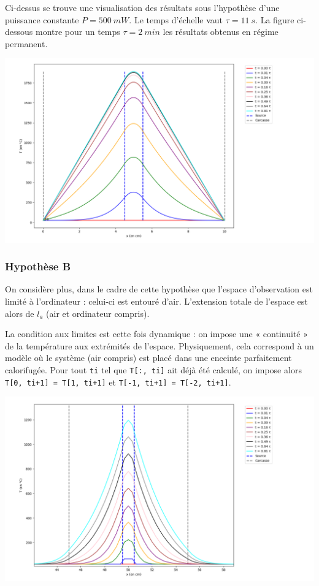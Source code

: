 \documentclass{article}
\newcommand{\p}{\texttt} %
\begin{document}
Ci-dessus se trouve une visualisation des résultats sous l'hypothèse d'une puissance constante $P = \SI{500}{mW}$. Le temps d'échelle vaut $\tau = \SI{11}{s}$. La figure ci-dessous montre pour un temps $\tau = \SI{2}{min}$ les résultats obtenus en régime permanent.

\includegraphics[scale=0.37]{1dA_P500mW_t110s.png}

\subsubsection{Hypothèse B}

On considère plus, dans le cadre de cette hypothèse que l'espace d'observation est limité à l'ordinateur : celui-ci est entouré d'air. L'extension totale de l'espace est alors de $l_a$ (air et ordinateur compris).

La condition aux limites est cette fois dynamique : on impose une « continuité » de la température aux extrémités de l'espace. Physiquement, cela correspond à un modèle où le système (air compris) est placé dans une enceinte parfaitement calorifugée. Pour tout \p{ti} tel que \p{T[:, ti]} ait déjà été calculé, on impose alors \p{T[0, ti+1] = T[1, ti+1]} et \p{T[-1, ti+1] = T[-2, ti+1]}.

\includegraphics[scale=0.37]{1dB_P500mW_t11s.png}
\end{document}
